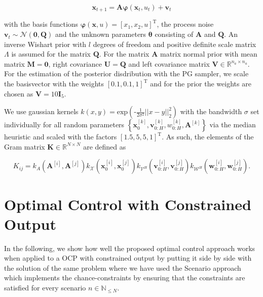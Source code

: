 \begin{equation} \label{State transition}
\boldsymbol{x}_{t+1} = \boldsymbol{A} \boldsymbol{\varphi}(\boldsymbol{x}_t, u_t) + \boldsymbol{v}_{t}
\end{equation}

with the basis functions $\boldsymbol{\varphi} (\boldsymbol{x}, u) = \left[ x_1,  x_2,  u \right]^\text{T}$, the process noise $\boldsymbol{v}_{t} \sim \mathcal{N} (\boldsymbol{0}, \boldsymbol{Q})$ and the unknown parameters $\boldsymbol{\theta}$ consisting of $\boldsymbol{A}$ and $\boldsymbol{Q}$. An inverse Wishart  prior with $l$ degrees of freedom and positive definite scale matrix $\Lambda$ is assumed for the matrix $\boldsymbol{Q}$. For the matrix $\boldsymbol{A}$ matrix normal prior with mean matrix $\boldsymbol{M} = \boldsymbol{0}$, right covariance $\boldsymbol{U} = \boldsymbol{Q}$ and left covariance matrix $\boldsymbol{V} \in \mathbb{R}^{n_a \times n_a}.$ For the estimation of the posterior disdribution with the PG sampler, we scale the basisvector with the weights $\left[ 0.1,  0.1,  1 \right]^\text{T}$ and for the prior the weights are chosen as $\boldsymbol{V} = 10 \boldsymbol{I}_5$.

We use gaussian kernels $k(x,y) = \text{exp}\left(\text{-}\frac{1}{2\sigma^2} ||x - y||_2^2 \right)$ with the bandwidth $\sigma$ set individually for all random parameters $\left\{\boldsymbol{x}_0^{[k]}, \boldsymbol{v}_{0:H}^{[k]}, w_{0:H}^{[k]},  \boldsymbol{A}^{[k]}\right\}$ via the median heuristic \cite{Damien_18} and scaled with the factors $\left[ 1.5, 5, 5, 1 \right]^\text{T}$. As such, the elements of the Gram matrix $\boldsymbol{K} \in \mathbb{R}^{N \times N }$ are defined as

\begin{equation} \label{Kernel equation}
K_{ij} = k_{A}(\boldsymbol{A}^{[i]}, \boldsymbol{A}^{[j]})  k_{\mathcal{X}}(\boldsymbol{x}_0^{[i]}, \boldsymbol{x}_0^{[j]})    k_{\mathcal{V}^H}(\boldsymbol{v}_{0:H}^{[i]}, \boldsymbol{v}_{0:H}^{[j]})  k_{\mathcal{W}^H}(\boldsymbol{w}_{0:H}^{[i]}, \boldsymbol{w}_{0:H}^{[j]}).
\end{equation}


\section{Optimal Control with Constrained Output} \label{optimal control}

In the following, we show how well the proposed optimal control approach works when applied to a OCP with constrained output by putting it side by side with the solution of the same problem where we have used the Scenario approach which implements the chance-constraints by ensuring that the constraints are satisfied for every scenario $n \in \mathbb{N}_{\leq N}$.

